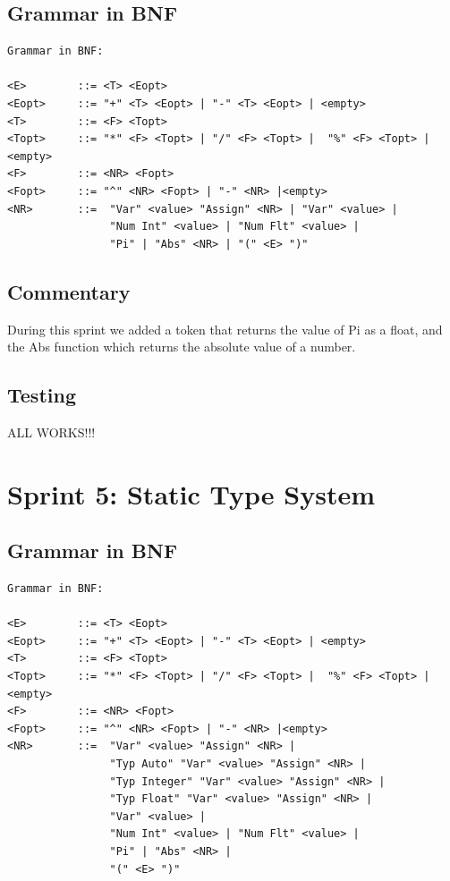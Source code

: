 \documentclass[a4paper, oneside, 11pt]{report}
\begin{document}
    \subsection{Grammar in BNF}
    \begin{verbatim}
Grammar in BNF:

<E>        ::= <T> <Eopt>
<Eopt>     ::= "+" <T> <Eopt> | "-" <T> <Eopt> | <empty>
<T>        ::= <F> <Topt>
<Topt>     ::= "*" <F> <Topt> | "/" <F> <Topt> |  "%" <F> <Topt> |<empty>
<F>        ::= <NR> <Fopt>
<Fopt>     ::= "^" <NR> <Fopt> | "-" <NR> |<empty>
<NR>       ::=  "Var" <value> "Assign" <NR> | "Var" <value> |
                "Num Int" <value> | "Num Flt" <value> |
                "Pi" | "Abs" <NR> | "(" <E> ")"
    \end{verbatim}

    \subsection{Commentary}
    During this sprint we added a token that returns the value of Pi as a float, and the Abs function which returns the absolute value of a number.


    \subsection{Testing}
    ALL WORKS!!!


    \clearpage
    \section{Sprint 5: Static Type System}
    \subsection{Grammar in BNF}
    \begin{verbatim}
Grammar in BNF:

<E>        ::= <T> <Eopt>
<Eopt>     ::= "+" <T> <Eopt> | "-" <T> <Eopt> | <empty>
<T>        ::= <F> <Topt>
<Topt>     ::= "*" <F> <Topt> | "/" <F> <Topt> |  "%" <F> <Topt> |<empty>
<F>        ::= <NR> <Fopt>
<Fopt>     ::= "^" <NR> <Fopt> | "-" <NR> |<empty>
<NR>       ::=  "Var" <value> "Assign" <NR> |
                "Typ Auto" "Var" <value> "Assign" <NR> |
                "Typ Integer" "Var" <value> "Assign" <NR> |
                "Typ Float" "Var" <value> "Assign" <NR> |
                "Var" <value> |
                "Num Int" <value> | "Num Flt" <value> |
                "Pi" | "Abs" <NR> |
                "(" <E> ")"
    \end{verbatim}
\end{document}
